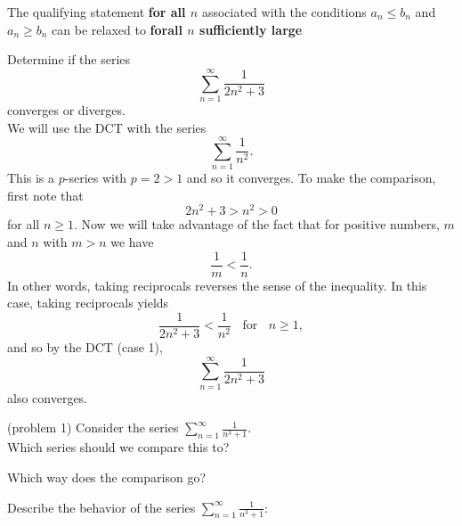 \documentclass[handout]{ximera}
\begin{document}
\begin{remark}
The qualifying statement \textbf{for all $n$} associated with the
 conditions $a_n \leq b_n$ and $ a_n \geq b_n$ can be relaxed to
  \textbf{forall $n$ sufficiently large}
\end{remark}



\begin{example}[example 1] %
Determine if the series 
\[
\sum_{n=1}^\infty \frac{1}{2n^2 + 3}
\]
converges or diverges.\\
We will use the DCT with the series 
\[
\sum_{n=1}^\infty \frac{1}{n^2}.
\] 
This is a $p$-series with $p=2 >1$ and so it converges.
To make the comparison, first note that 
\[
2n^2 + 3 > n^2 > 0
\]
 for all $n \geq 1$. Now we will take advantage of the fact that for positive numbers, $m$ and $n$ with $m>n$ we have 
 \[
 \frac{1}{m} < \frac{1}{n}.
 \]
 In other words, taking reciprocals reverses the sense of the inequality. In this case, taking reciprocals yields 
\[
\frac{1}{2n^2 + 3} < \frac{1}{n^2} \; \; \text{ for } \; \; n \geq 1,
\]
and so by the DCT (case 1), 
\[
\sum_{n=1}^\infty \frac{1}{2n^2 + 3}
\]
 also converges.
\end{example}


\begin{problem}(problem 1)
Consider the series $\displaystyle{\sum_{n=1}^\infty \frac{1}{n^3 + 1}}$.\\
Which series should we compare this to?
\begin{center}
\begin{multipleChoice}
\choice{\[\sum_{n=1}^\infty \frac{1}{n^2}\]}
\choice[correct]{\[\sum_{n=1}^\infty \frac{1}{n^3}\]}
\choice{\[\sum_{n=1}^\infty \frac{1}{3^n}\]}
\end{multipleChoice}
\end{center}

Which way does the comparison go?
\begin{center}
\begin{multipleChoice}
\end{multipleChoice}
\end{center}

Describe the behavior of the series $\displaystyle{\sum_{n=1}^\infty \frac{1}{n^3 + 1}:}$
\begin{center}
\begin{multipleChoice}
\end{multipleChoice}
\end{center}

\end{problem}
\end{document}
